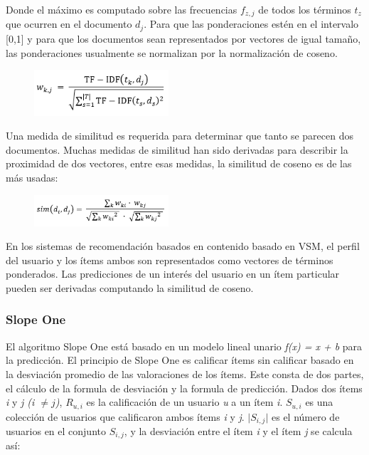 \documentclass[12pt,letterpaper,openany]{book}
\begin{document}
Donde el máximo es computado sobre las frecuencias $f_{z,j}$ de todos los términos $t_{z}$ que ocurren en el documento $d_{j}$. Para que las ponderaciones estén en el intervalo [0,1] y para que los documentos sean representados por vectores de igual tamaño, las ponderaciones usualmente se normalizan por la normalización de coseno.

\begin{figure}[H]
\begin{center}
\includegraphics[width=5cm]{./imagenes/formulas/form7}
\end{center}
\end{figure}

Una medida de similitud es requerida para determinar que tanto se parecen dos documentos. Muchas medidas de similitud han sido derivadas para describir la proximidad de dos vectores, entre esas medidas, la similitud de coseno es de las más usadas:

\begin{figure}[H]
\begin{center}
\includegraphics[width=5cm]{./imagenes/formulas/form8}
\end{center}
\end{figure}

En los sistemas de recomendación basados en contenido basado en VSM, el perfil del usuario y los ítems ambos son representados como vectores de términos ponderados. Las predicciones de un interés del usuario en un ítem particular pueden ser derivadas computando la similitud de coseno.

\subsubsection{Slope One \cite{27}}
El algoritmo Slope One está basado en un modelo lineal unario \textit{f(x) = x + b} para la predicción. El principio de Slope One es calificar ítems sin calificar basado en la desviación promedio de las valoraciones de los ítems. Este consta de dos partes, el cálculo de la formula de desviación y la formula de predicción. Dados dos ítems \textit{i} y \textit{j (i $\neq{j}$)}, $R_{u,i}$ es la calificación de un usuario \textit{u} a un ítem \textit{i}. $S_{u,i}$ es una colección de usuarios que calificaron ambos ítems \textit{i} y \textit{j}. $\vert{S_{i,j}}\vert$ es el número de usuarios en el conjunto $S_{i,j}$, y la desviación entre el ítem \textit{i} y el ítem \textit{j} se calcula así:
\end{document}
